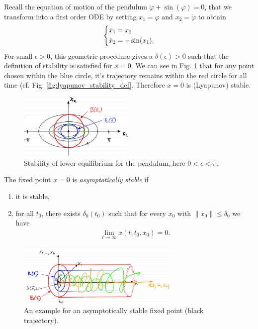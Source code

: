 \begin{ex}
	Recall the equation of motion of the pendulum $\ddot{\varphi} + \sin(\varphi) = 0$, that we transform into a first order ODE by setting $x_1 = \varphi$ and $x_2 = \dot{\varphi}$ to obtain
	\begin{align}
		\begin{dcases}
		\dot{x}_1 = x_2 \\
	\dot{x}_2 = -\sin(x_1).
		\end{dcases}
	\end{align}
	For small $\epsilon>0$, this geometric procedure gives a $\delta(\epsilon)>0$ such that the definition of stability is satisfied for $ {x}=0$. We can see in Fig. \ref{fig:pend_lower_stability}  that for any point chosen within the blue circle, it's trajectory remains within the red circle for all time (cf. Fig. \ref{fig:lyapunov_stability_def}. Therefore $ {x}=0$ is (Lyapunov) stable.
	\begin{figure}[h!]
		\centering
		\includegraphics[width=0.5\textwidth]{figures/ch2/2pendulum_stability.png}
		\caption{Stability of lower equilibrium for the pendulum, here $0<\epsilon<\pi $.}
	\label{fig:pend_lower_stability}
	\end{figure}
\end{ex}

\begin{definition}
	The fixed point $ {x}=0$ is \emph{asymptotically stable} if
\begin{enumerate}
	\item it is stable,
	\item for all $t_0$, there exists $\delta_0(t_0)$ such that for every $ {x}_0$ with $\|  {x}_0 \| \leq \delta_0$ we have
		\begin{align}
			\boxed{\lim_{t\to \infty }  {x}(t; t_0,  {x}_0) = 0.}
		\end{align}
\end{enumerate}
\begin{figure}[h!]
	\centering
	\includegraphics[width=0.7\textwidth]{figures/ch2/3asymp_stability.png}
	\caption{An example for an asymptotically stable fixed point (black trajectory).}
\end{figure}
\end{definition}

